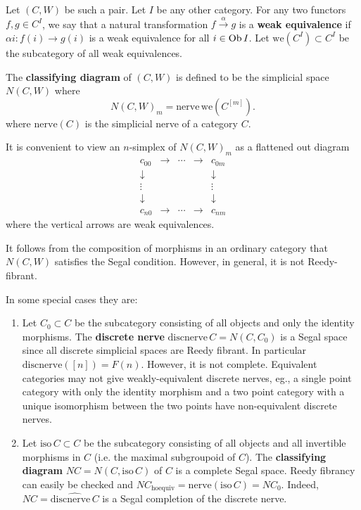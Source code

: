 \begin{refsection}
\begin{defin}
Let $(C,W)$ be such a pair. Let $I$ be any other category. For any two functors $f,g\in C^I$, we say that a natural transformation $f\xrightarrow{\alpha}g$ is a \textbf{weak equivalence} if $\alpha i \colon f(i) \to g(i)$ is a weak equivalence for all $i\in\operatorname{Ob} I$. Let $\mathrm{we}(C^I)\subset C^I$ be the subcategory of all weak equivalences.

The \textbf{classifying diagram} of $(C,W)$ is defined to be the simplicial space $N(C,W)$ where
\[
N(C,W)_m=\mathrm{nerve}\,\mathrm{we}(C^{[m]}).
\]
where $\mathrm{nerve}(C)$ is the simplicial nerve of a category $C$.
\end{defin}
It is convenient to view an $n$-simplex of $N(C,W)_m$ as a flattened out diagram
\begin{equation}\label{visualncw}
\begin{matrix} c_{00}&\to&\cdots&\to&c_{0m}\\\downarrow&&&&\downarrow\\\vdots&&&&\vdots\\\downarrow&&&&\downarrow\\c_{n0}&\to&\cdots&\to&c_{nm}
\end{matrix}
\end{equation}
where the vertical arrows are weak equivalences.

It follows from the composition of morphisms in an ordinary category that $N(C,W)$ satisfies the Segal condition. However, in general, it is not Reedy-fibrant.

In some special cases they are:
\begin{eg}\label{nerveeg}
\begin{enumerate}
\item Let $C_0\subset C$ be the subcategory consisting of all objects and only the identity morphisms. The \textbf{discrete nerve} $\mathrm{discnerve}\,C=N(C,C_0)$ is a Segal space since all discrete simplicial spaces are Reedy fibrant. In particular $\mathrm{discnerve}([n])=F(n)$. However, it is not complete. Equivalent categories may not give weakly-equivalent discrete nerves, eg., a single point category with only the identity morphism and a two point category with a unique isomorphism between the two points have non-equivalent discrete nerves.

\item Let $\mathrm{iso}\,C\subset C$ be the subcategory consisting of all objects and all invertible morphisms in $C$ (i.e. the maximal subgroupoid of $C$). The \textbf{classifying diagram} $NC=N(C,\mathrm{iso}\,C)$ of $C$ is a complete Segal space. Reedy fibrancy can easily be checked and $NC_{\mathrm{hoequiv}}=\mathrm{nerve}(\mathrm{iso}\,C)=NC_0$. Indeed, $NC=\widehat{\mathrm{discnerve}\,C}$ is a Segal completion of the discrete nerve.


\end{enumerate}
\end{eg}
\end{refsection}
